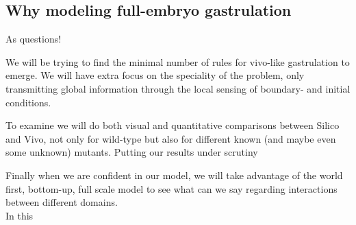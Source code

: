 \subsection{Why modeling full-embryo gastrulation }
As questions!










We will be trying to find the minimal number of rules for vivo-like gastrulation to emerge. We will have extra focus on the speciality of the problem, only transmitting global information through the local sensing of boundary- and initial conditions.

To examine we will do both visual and quantitative comparisons between Silico and Vivo, not only for wild-type but also for different known (and maybe even some unknown) mutants. Putting our results under scrutiny 

Finally when we are confident in our model, we will take advantage of the world first, bottom-up, full scale model to see what can we say regarding interactions between different domains.\\





In this





